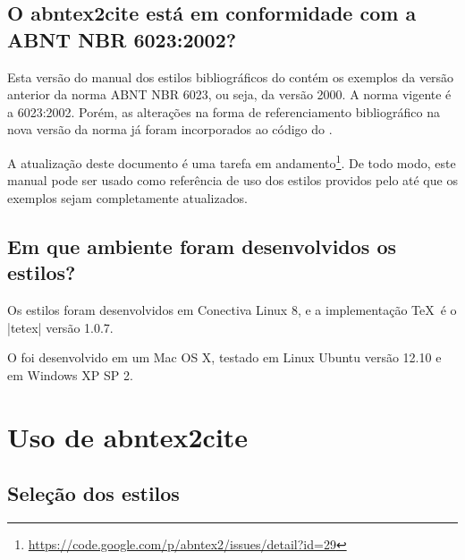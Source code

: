 \documentclass[a4paper]{ltxdoc}
\begin{document}

\subsection{O \textsf{abntex2cite} está em conformidade com a ABNT NBR
6023:2002?}
\label{sec-intro-compatibidade-6023-2002}

Esta versão do manual dos estilos bibliográficos do  contém os exemplos
da versão anterior da norma ABNT NBR 6023, ou seja, da versão 2000. A norma
vigente é a 6023:2002. Porém, as alterações na forma de referenciamento
bibliográfico na nova versão da norma já foram incorporados ao código do
.

A atualização deste documento é uma tarefa em
andamento\footnote{\url{https://code.google.com/p/abntex2/issues/detail?id=29}}.
De todo modo, este manual pode ser usado como referência de uso dos estilos
providos pelo  até que os exemplos sejam completamente atualizados.

\subsection{Em que ambiente foram desenvolvidos os estilos?}

Os estilos foram desenvolvidos em Conectiva Linux 8, e a implementação \TeX\ é
o |tetex| versão 1.0.7.

O  foi desenvolvido em um Mac OS X, testado em Linux Ubuntu versão 12.10
e em Windows XP SP 2.

\section{Uso de \textsf{abntex2cite}}

\subsection{Seleção dos estilos}
\end{document}
